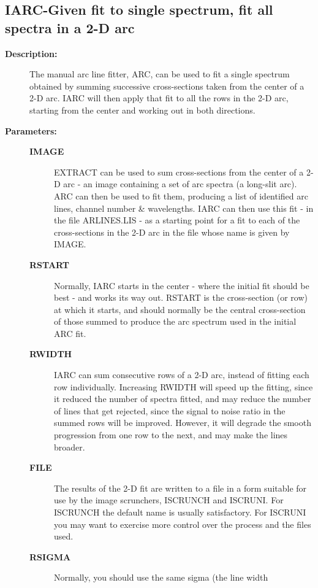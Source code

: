 \subsection{IARC-\label{IARC}Given fit to single spectrum, fit all spectra in a 2-D arc}
\begin{description}

\item [{\bf Description:}]
 The manual arc line fitter, ARC, can be used to fit a single
 spectrum obtained by summing successive cross-sections taken
 from the center of a 2-D arc.  IARC will then apply that fit
 to all the rows in the 2-D arc, starting from the center and
 working out in both directions.

\item [{\bf Parameters:}]
\begin{description}
\item [{\bf IMAGE}]
 EXTRACT can be used to sum cross-sections from the
 center of a 2-D arc - an image containing a set of arc
 spectra (a long-slit arc).  ARC can then be used to fit
 them, producing a list of identified arc lines, channel
 number \& wavelengths.  IARC can then use this fit - in
 the file ARLINES.LIS - as a starting point for a fit to
 each of the cross-sections in the 2-D arc in the file
 whose name is given by IMAGE.
\item [{\bf RSTART}]
 Normally, IARC starts in the center - where the initial
 fit should be best - and works its way out.  RSTART is
 the cross-section (or row) at which it starts, and should
 normally be the central cross-section of those summed to
 produce the arc spectrum used in the initial ARC fit.
\item [{\bf RWIDTH}]
 IARC can sum consecutive rows of a 2-D arc, instead of
 fitting each row individually.  Increasing RWIDTH will
 speed up the fitting, since it reduced the number of
 spectra fitted, and may reduce the number of lines that
 get rejected, since the signal to noise ratio in the
 summed rows will be improved.  However, it will degrade
 the smooth progression from one row to the next, and may
 make the lines broader.
\item [{\bf FILE}]
 The results of the 2-D fit are written to a file in a
 form suitable for use by the image scrunchers, ISCRUNCH
 and ISCRUNI.  For ISCRUNCH the default name is usually
 satisfactory.  For ISCRUNI you may want to exercise more
 control over the process and the files used.
\item [{\bf RSIGMA}]
 Normally, you should use the same sigma (the line width

\end{description}
\end{description}
